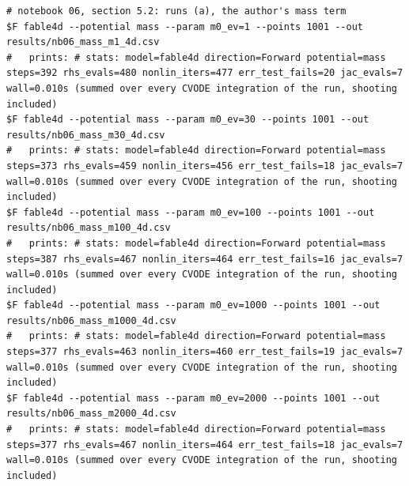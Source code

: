\begin{Verbatim}[fontsize=\scriptsize]
# notebook 06, section 5.2: runs (a), the author's mass term
$F fable4d --potential mass --param m0_ev=1 --points 1001 --out results/nb06_mass_m1_4d.csv
#   prints: # stats: model=fable4d direction=Forward potential=mass steps=392 rhs_evals=480 nonlin_iters=477 err_test_fails=20 jac_evals=7 wall=0.010s (summed over every CVODE integration of the run, shooting included)
$F fable4d --potential mass --param m0_ev=30 --points 1001 --out results/nb06_mass_m30_4d.csv
#   prints: # stats: model=fable4d direction=Forward potential=mass steps=373 rhs_evals=459 nonlin_iters=456 err_test_fails=18 jac_evals=7 wall=0.010s (summed over every CVODE integration of the run, shooting included)
$F fable4d --potential mass --param m0_ev=100 --points 1001 --out results/nb06_mass_m100_4d.csv
#   prints: # stats: model=fable4d direction=Forward potential=mass steps=387 rhs_evals=467 nonlin_iters=464 err_test_fails=16 jac_evals=7 wall=0.010s (summed over every CVODE integration of the run, shooting included)
$F fable4d --potential mass --param m0_ev=1000 --points 1001 --out results/nb06_mass_m1000_4d.csv
#   prints: # stats: model=fable4d direction=Forward potential=mass steps=377 rhs_evals=463 nonlin_iters=460 err_test_fails=19 jac_evals=7 wall=0.010s (summed over every CVODE integration of the run, shooting included)
$F fable4d --potential mass --param m0_ev=2000 --points 1001 --out results/nb06_mass_m2000_4d.csv
#   prints: # stats: model=fable4d direction=Forward potential=mass steps=377 rhs_evals=467 nonlin_iters=464 err_test_fails=18 jac_evals=7 wall=0.010s (summed over every CVODE integration of the run, shooting included)
\end{Verbatim}
